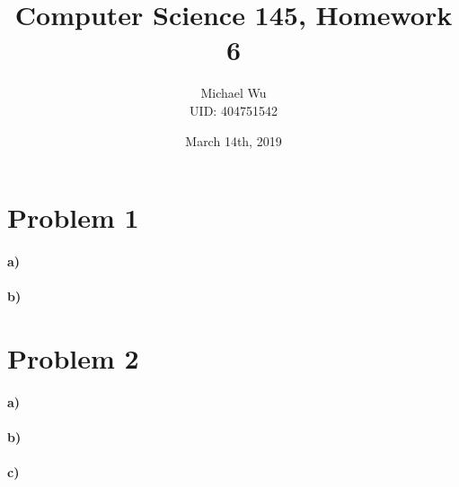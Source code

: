\documentclass[12pt]{article}
\begin{document}
\title{Computer Science 145, Homework 6}
\date{March 14th, 2019}
\author{Michael Wu\\UID: 404751542}
\maketitle

\section*{Problem 1}

\paragraph{a)}

\paragraph{b)}

\section*{Problem 2}

\paragraph{a)}

\paragraph{b)}

\paragraph{c)}
\end{document}
